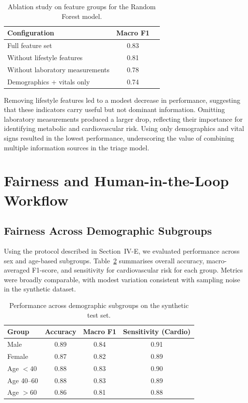 \documentclass[conference]{IEEEtran}
\begin{document}
\begin{table}[t]
    \centering
    \caption{Ablation study on feature groups for the Random Forest model.}
    \label{tab:ablation}
    \begin{tabular}{lcc}
        \toprule
        Configuration & Macro F1 \\
        \midrule
        Full feature set                   & 0.83 \\
        Without lifestyle features        & 0.81 \\
        Without laboratory measurements   & 0.78 \\
        Demographics + vitals only        & 0.74 \\
        \bottomrule
    \end{tabular}
\end{table}

Removing lifestyle features led to a modest decrease in performance, suggesting that these indicators carry useful but not dominant information. Omitting laboratory measurements produced a larger drop, reflecting their importance for identifying metabolic and cardiovascular risk. Using only demographics and vital signs resulted in the lowest performance, underscoring the value of combining multiple information sources in the triage model.

\section{Fairness and Human-in-the-Loop Workflow}

\subsection{Fairness Across Demographic Subgroups}

Using the protocol described in Section~IV-E, we evaluated performance across sex and age-based subgroups. Table~\ref{tab:fairness} summarises overall accuracy, macro-averaged F1-score, and sensitivity for cardiovascular risk for each group. Metrics were broadly comparable, with modest variation consistent with sampling noise in the synthetic dataset.

\begin{table}[t]
    \centering
    \caption{Performance across demographic subgroups on the synthetic test set.}
    \label{tab:fairness}
    \begin{tabular}{lccc}
        \toprule
        Group & Accuracy & Macro F1 & Sensitivity (Cardio) \\
        \midrule
        Male        & 0.89 & 0.84 & 0.91 \\
        Female      & 0.87 & 0.82 & 0.89 \\
        Age $< 40$  & 0.88 & 0.83 & 0.90 \\
        Age 40--60  & 0.88 & 0.83 & 0.89 \\
        Age $> 60$  & 0.86 & 0.81 & 0.88 \\
        \bottomrule
    \end{tabular}
\end{table}
\end{document}
